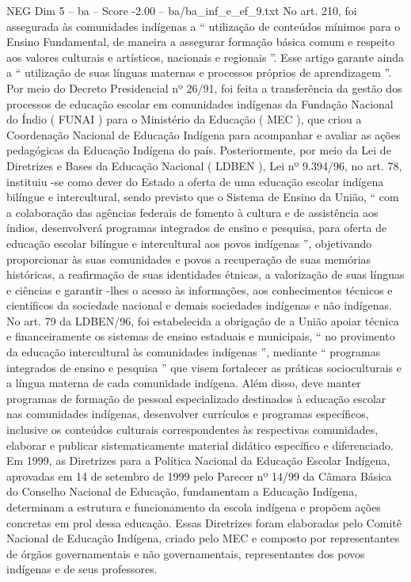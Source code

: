 \begin{textsample}{NEG Dim 5 – ba – Score -2.00 – ba/ba\_inf\_e\_ef\_9.txt}
No art. 210, foi assegurada às comunidades indígenas a “ utilização de conteúdos mínimos para o Ensino Fundamental, de maneira a assegurar formação básica comum e respeito aos valores culturais e artísticos, nacionais e regionais ”.
Esse artigo garante ainda a “ utilização de suas línguas maternas e processos próprios de aprendizagem ”.
Por meio do Decreto Presidencial nº 26/91, foi feita a transferência da gestão dos processos de educação escolar em comunidades indígenas da Fundação Nacional do Índio ( FUNAI ) para o Ministério da Educação ( MEC ), que criou a Coordenação Nacional de Educação Indígena para acompanhar e avaliar as ações pedagógicas da Educação Indígena do país.
Posteriormente, por meio da Lei de Diretrizes e Bases da Educação Nacional ( LDBEN ), Lei nº 9.394/96, no art. 78, instituiu -se como dever do Estado a oferta de uma educação escolar indígena bilíngue e intercultural, sendo previsto que o Sistema de Ensino da União, “ com a colaboração das agências federais de fomento à cultura e de assistência aos índios, desenvolverá programas integrados de ensino e pesquisa, para oferta de educação escolar bilíngue e intercultural aos povos indígenas ”, objetivando proporcionar às suas comunidades e povos a recuperação de suas memórias históricas, a reafirmação de suas identidades étnicas, a valorização de suas línguas e ciências e garantir -lhes o acesso às informações, aos conhecimentos técnicos e científicos da sociedade nacional e demais sociedades indígenas e não indígenas.
No art. 79 da LDBEN/96, foi estabelecida a obrigação de a União apoiar técnica e financeiramente os sistemas de ensino estaduais e municipais, “ no provimento da educação intercultural às comunidades indígenas ”, mediante “ programas integrados de ensino e pesquisa ” que visem fortalecer as práticas socioculturais e a língua materna de cada comunidade indígena.
Além disso, deve manter programas de formação de pessoal especializado destinados à educação escolar nas comunidades indígenas, desenvolver currículos e programas específicos, inclusive os conteúdos culturais correspondentes às respectivas comunidades, elaborar e publicar sistematicamente material didático específico e diferenciado.
Em 1999, as Diretrizes para a Política Nacional da Educação Escolar Indígena, aprovadas em 14 de setembro de 1999 pelo Parecer nº 14/99 da Câmara Básica do Conselho Nacional de Educação, fundamentam a Educação Indígena, determinam a estrutura e funcionamento da escola indígena e propõem ações concretas em prol dessa educação.
Essas Diretrizes foram elaboradas pelo Comitê Nacional de Educação Indígena, criado pelo MEC e composto por representantes de órgãos governamentais e não governamentais, representantes dos povos indígenas e de seus professores.

\end{textsample}
